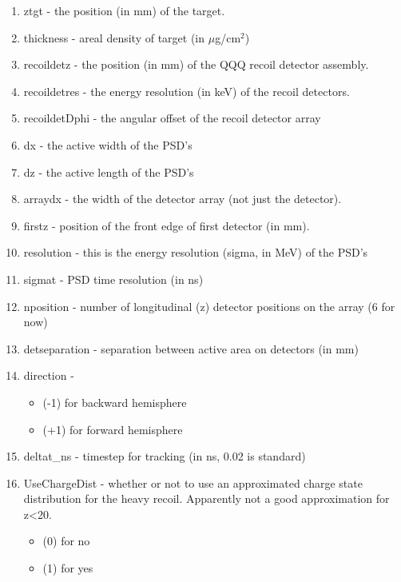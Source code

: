 \begin{singlespace}
\begin{itemize}
\begin{enumerate}
			\item \textsf{ztgt} - the position (in mm) of the target. 
			\item \textsf{thickness} -  areal density of target (in $\mu$g/cm$^2$)
			\item \textsf{recoildetz} - the position (in mm) of the QQQ recoil detector assembly.
			\item \textsf{recoildetres} - the energy resolution (in keV) of the recoil detectors.
			\item \textsf{recoildetDphi} - the angular offset of the recoil detector array
			\item \textsf{dx} - the active width of the PSD's
			\item \textsf{dz} - the active length of the PSD's
			\item \textsf{arraydx} - the width of the detector array (not just the detector).
			\item \textsf{firstz} - position of the front edge of first detector (in mm).
			\item \textsf{resolution} - this is the energy resolution (sigma, in MeV) of the PSD's
			\item \textsf{sigmat} - PSD time resolution (in ns)
			\item \textsf{nposition} - number of longitudinal (z) detector positions on the array (6 for now)
			\item \textsf{detseparation} - separation between active area on detectors (in mm)
			\item \textsf{direction} -  
				\begin{itemize}
					\setlength{\itemsep}{0pt}
  				\setlength{\parskip}{0pt}
  				\setlength{\parsep}{0pt}
					\item (-1) for backward hemisphere
					\item (+1) for forward hemisphere
				\end{itemize}
			\item \textsf{deltat\_ns} -  timestep for tracking (in ns, 0.02 is standard)
			\item \textsf{UseChargeDist} - whether or not to use an approximated charge state distribution for the heavy recoil. Apparently not a good approximation for z<20.
				\begin{itemize}
					\setlength{\itemsep}{0pt}
  				\setlength{\parskip}{0pt}
  				\setlength{\parsep}{0pt}
					\item (0) for no
					\item (1) for yes
				\end{itemize}

\end{enumerate}
\end{itemize}
\end{singlespace}
